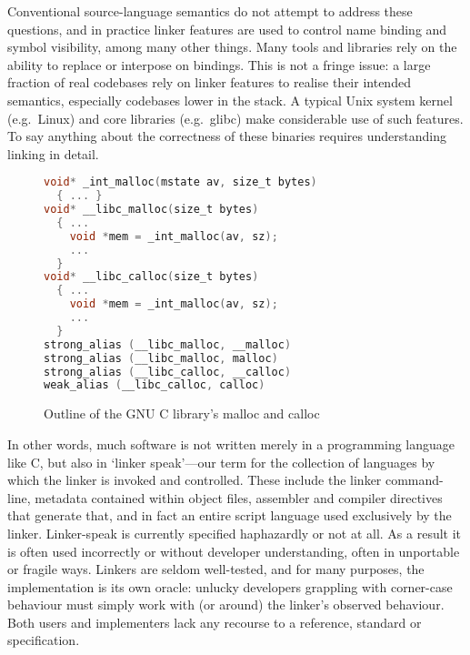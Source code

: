 %
%
Conventional source-language semantics do not attempt to address these
questions, and in practice
linker features are used to control name binding and symbol
visibility, among many other things. 
Many tools and libraries rely on the ability to replace or interpose on bindings.
This is not a fringe issue: a large fraction of real codebases rely on
linker features to realise their intended semantics, especially codebases lower in the stack. 
A typical Unix system kernel (e.g.~Linux) and core libraries (e.g.~\textsf{glibc}) make considerable use of such features.
To say anything about the correctness of these binaries requires
understanding linking in detail. 

\begin{figure}[t]
\begin{lstlisting}[language=C,basicstyle=\footnotesize\sffamily,columns=flexible]
void* _int_malloc(mstate av, size_t bytes)
  { ... }
void* __libc_malloc(size_t bytes)
  { ...
    void *mem = _int_malloc(av, sz);
    ...
  }
void* __libc_calloc(size_t bytes)
  { ...
    void *mem = _int_malloc(av, sz);
    ...
  }
strong_alias (__libc_malloc, __malloc) 
strong_alias (__libc_malloc, malloc)
strong_alias (__libc_calloc, __calloc) 
weak_alias (__libc_calloc, calloc)
\end{lstlisting}
\caption{Outline of the GNU C library's \textsf{malloc} and \textsf{calloc}}
\label{fig:glibc-malloc}
\end{figure}

In other words, much software is not written merely in a programming
language like C, 
but also in `linker speak'---our term for the collection of languages by which the linker is invoked and controlled.
These include the linker command-line, metadata contained within object files, assembler and compiler directives that generate that, and in fact an entire script language used exclusively by the linker.
%
Linker-speak is currently specified haphazardly or not at all.
As a result it is often used incorrectly or without developer understanding, often in unportable or fragile ways.
Linkers are seldom well-tested, and for many purposes, the implementation is its own oracle: unlucky developers grappling with corner-case behaviour must simply work with (or around) the linker's observed behaviour.
Both users and implementers lack any recourse to a reference, standard or specification. 


